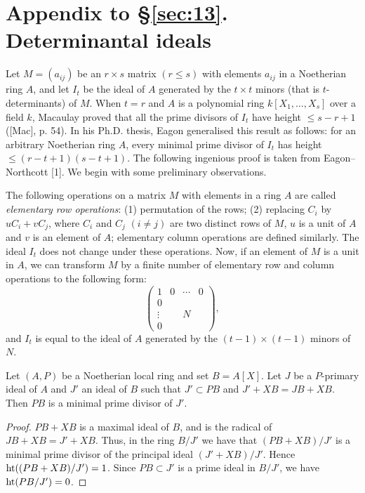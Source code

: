 \section*{Appendix to \S\ref{sec:13}. Determinantal ideals}
{}

Let $M = (a_{ij})$ be an $r \times s$ matrix $(r \le s)$ with elements $a_{ij}$ in a Noetherian ring
$A$, and let $I_t$ be the ideal of $A$ generated by the $t \times t$ minors (that is
$t$-determinants) of $M$. When $t = r$ and $A$ is a polynomial ring
$k[X_1, \ldots, X_s]$ over a field $k$, Macaulay proved that all the prime divisors of
$I_t$ have height $\le s - r + 1$ ([Mac], p. 54). In his Ph.D. thesis, Eagon
generalised this result as follows: for an arbitrary Noetherian ring $A$, every
minimal prime divisor of $I_t$ has height $\le (r - t + 1)(s - t + 1)$. The following
ingenious proof is taken from Eagon--Northcott [1]. We begin with some
preliminary observations.

The following operations on a matrix $M$ with elements in a ring $A$ are
called \emph{elementary row operations}: (1) permutation of the rows; (2) replacing
$C_i$ by $uC_i + vC_j$, where $C_i$ and $C_j$ $(i \neq j)$ are two distinct rows of $M$, $u$ is a unit
of $A$ and $v$ is an element of $A$; elementary column operations are defined
similarly. The ideal $I_t$ does not change under these operations. Now, if an
element of $M$ is a unit in $A$, we can transform $M$ by a finite number of
elementary row and column operations to the following form:
\[
  \begin{pmatrix}
    1 & 0 & \cdots & 0 \\
    0 & & & \\
    \vdots & & N & \\
    0 & & &
  \end{pmatrix},
\]
and $I_t$ is equal to the ideal of $A$ generated by the $(t - 1) \times (t - 1)$ minors of $N$.

\begin{lemma}\label{lem:13.1}
Let $(A, P)$ be a Noetherian local ring and set $B = A[X]$. Let $J$ be a
$P$-primary ideal of $A$ and $J'$ an ideal of $B$ such that $J' \subset PB$ and
$J' + XB = JB + XB$. Then $PB$ is a minimal prime divisor of $J'$.
\end{lemma}

\begin{proof}
$PB + XB$ is a maximal ideal of $B$, and is the radical of $JB + XB =
J' + XB$. Thus, in the ring $B/J'$ we have that $(PB + XB)/J'$ is a minimal
prime divisor of the principal ideal $(J' + XB)/J'$. Hence $\operatorname{ht}((PB + XB)/
J') = 1$. Since $PB \subset J'$ is a prime ideal in $B/J'$, we have $\operatorname{ht}(PB/J') = 0$.
\end{proof}

